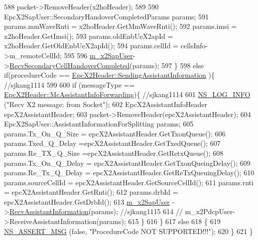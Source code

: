 \begin{DoxyCode}
588       packet->RemoveHeader(x2hoHeader);
589 
590       EpcX2SapUser::SecondaryHandoverCompletedParams params;
591       params.mmWaveRnti = x2hoHeader.GetMmWaveRnti();
592       params.imsi = x2hoHeader.GetImsi();
593       params.oldEnbUeX2apId = x2hoHeader.GetOldEnbUeX2apId();
594       params.cellId = cellsInfo->m\_remoteCellId;
595 
596       \hyperlink{classns3_1_1EpcX2_a0a74a3c19067fe18af3021c7b4c24c19}{m\_x2SapUser}->\hyperlink{classns3_1_1EpcX2SapUser_adb0b6750c0bf917699fe87e84270aebb}{RecvSecondaryCellHandoverCompleted}(params);
597     \}
598   \textcolor{keywordflow}{else} \textcolor{keywordflow}{if}(procedureCode == \hyperlink{classns3_1_1EpcX2Header_afd178c1ed3c47948c587955698a15b0daeab9c84ab3a33a09c4ae2fccfec2eecb}{EpcX2Header::SendingAssistantInformation}
      )\{ \textcolor{comment}{//sjkang1114}
599 
600         \textcolor{keywordflow}{if} (messageType == \hyperlink{classns3_1_1EpcX2Header_a0e69b043a20eaee4c570f223f4eca715ac5c673b39296b5c9b4cedf3575e0bb60}{EpcX2Header::McAssistantInfoForwarding})\{ \textcolor{comment}{
      //sjkang1114}
601                   \hyperlink{group__logging_gafbd73ee2cf9f26b319f49086d8e860fb}{NS\_LOG\_INFO} (\textcolor{stringliteral}{"Recv X2 message: from Socket"});
602                 EpcX2AssistantInfoHeader epcX2AssistantHeader;
603                 packet->RemoveHeader(epcX2AssistantHeader);
604                 EpcX2SapUser::AssistantInformationForSplitting params;
605                 params.Tx\_On\_Q\_Size = epcX2AssistantHeader.GetTxonQueue();
606                 params.Txed\_Q\_Delay =epcX2AssistantHeader.GetTxedQueue();
607                 params.Re\_TX\_Q\_Size =epcX2AssistantHeader.GetRetxQueue();
608                 params.Tx\_On\_Q\_Delay = epcX2AssistantHeader.GetTxonQueingDelay();
609                 params.Re\_Tx\_Q\_Delay = epcX2AssistantHeader.GetReTxQueuingDelay();
610                 params.sourceCellId = epcX2AssistantHeader.GetSourceCellId();
611                 params.rnti = epcX2AssistantHeader.GetRnti();
612                 params.drbId = epcX2AssistantHeader.GetDrbId();
613            \hyperlink{classns3_1_1EpcX2_a0a74a3c19067fe18af3021c7b4c24c19}{m\_x2SapUser} ->\hyperlink{classns3_1_1EpcX2SapUser_a4c52bc66e831a21ec8049e28760e2209}{RecvAssistantInformation}(params); \textcolor{comment}{//sjkang1115}
614           \textcolor{comment}{// m\_x2PdcpUser->ReceiveAssistantInformation(params);}
615                 \}
616     \}
617   \textcolor{keywordflow}{else}
618     \{
619       \hyperlink{assert_8h_aff5ece9066c74e681e74999856f08539}{NS\_ASSERT\_MSG} (\textcolor{keyword}{false}, \textcolor{stringliteral}{"ProcedureCode NOT SUPPORTED!!!"});
620     \}
621 \}
\end{DoxyCode}


